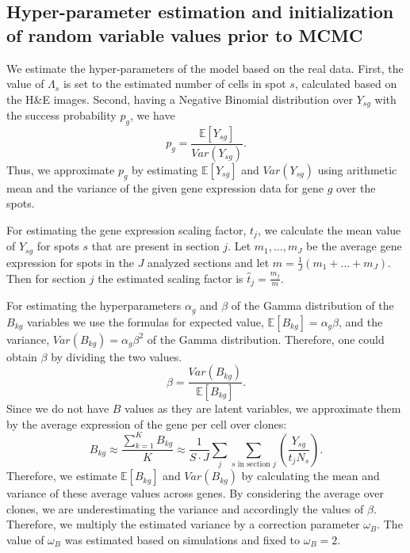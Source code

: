 \documentclass[unnumsec,webpdf,contemporary,large]{oup-authoring-template}%
\theoremstyle{thmstyleone}%
\theoremstyle{thmstyletwo}%
\theoremstyle{thmstylethree}%
\begin{document}
\begin{methods}
\subsection*{Hyper-parameter estimation and initialization of random variable values prior to MCMC}

We estimate the hyper-parameters of the model based on the real data. First, the value of  $\Lambda_s$ is set to the estimated number of cells in spot $s$, calculated based on the H\&E images. 
Second, having a Negative Binomial distribution over $Y_{sg}$ with the success probability $p_g$, we have $$p_g  = \frac{\mathbb{E}[Y_{sg}]}{Var(Y_{sg})}.$$
Thus, we approximate $p_g$ by estimating $\mathbb{E}[Y_{sg}]$ and ${Var(Y_{sg})}$ using arithmetic mean and the variance of the given gene expression data for gene $g$ over the spots. 

For estimating the gene expression scaling factor, $t_j$, we calculate the mean value of $Y_{sg}$ for spots $s$ that are present in section $j$. Let $m_{1},\ldots, m_{J}$ be the average gene expression for spots in the $J$ analyzed sections and let $m = \frac{1}{J}(m_{1} + \ldots + m_{J})$. Then for section $j$ the estimated scaling factor is $\hat{t}_{j} = \frac{m_{j}}{m}$.

For estimating the hyperparameters $\alpha_g$ and $\beta$ of the Gamma distribution of the $B_{kg}$ variables %
we use the formulas for expected value, $\mathbb{E}[B_{kg}] = \alpha_g\beta$, and the variance, $Var(B_{kg}) = \alpha_g\beta^2$ of the Gamma distribution. Therefore, one could obtain  $\beta$ by dividing the two values.$$\beta = \frac{Var(B_{kg})}{\mathbb{E}[B_{kg}]}.$$
Since we do not have $B$ values as they are latent variables, we approximate them by the average expression of the gene per cell over clones: 
$$B_{kg} \approx \frac{\sum_{k=1}^{K} B_{kg}}{K} \approx \frac{1}{S\cdot J} \sum_j \sum_{s \textrm{ in section } j} \left(\frac{Y_{sg}}{t_j N_s}\right).$$
Therefore, we estimate $\mathbb{E}[B_{kg}]$ and $Var(B_{kg})$ by calculating the mean and variance of these average values across genes. By considering the average over clones, we are underestimating the variance and accordingly the values of $\beta$. Therefore, we multiply the estimated variance by a correction parameter $\omega_{B}$. The value of $\omega_{B}$ was estimated based on simulations and fixed to $\omega_{B}=2$.


\end{methods}
\end{document}
